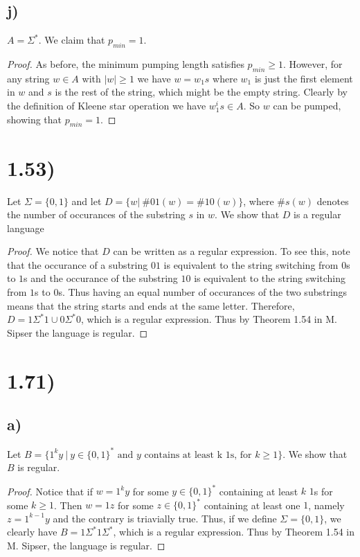 \documentclass[a4paper,11pt]{article}
\newcommand{\abs}[1]{\left\lvert #1 \right\rvert}
\numberwithin{equation}{section}
\begin{document}
\subsection*{j)}
$A=\Sigma^\ast$. We claim that $p_{min}=1$.
\begin{proof}
As before, the minimum pumping length satisfies $p_{min}\geq1$. However, for any string $w\in A$ with $\abs{w}\geq1$ we have $w=w_1s$ where $w_1$ is just the first element in $w$ and $s$ is the rest of the string, which might be the empty string. Clearly by the definition of Kleene star operation we have $w_1^is\in A$. So $w$ can be pumped, showing that $p_{min}=1$.
\end{proof}
\section*{1.53)}
Let $\Sigma=\{0,1\}$ and let $D=\{w \vert\ \#01(w)=\#10(w)\}$, where $\#s(w)$ denotes the number of occurances of the substring $s$ in $w$. We show that $D$ is a regular language\begin{proof}
We notice that $D$ can be written as a regular expression. To see this, note that the occurance of a substring $01$ is equivalent to the string switching from $0$s to $1$s and the occurance of the substring $10$ is equivalent to the string switching from $1$s to $0$s. Thus having an equal number of occurances of the two substrings means that the string starts and ends at the same letter. Therefore, $D=1\Sigma^\ast1\cup0\Sigma^\ast0$, which is a regular expression. Thus by Theorem 1.54 in M. Sipser the language is regular. 
\end{proof}
\section*{1.71)}
\subsection*{a)}
Let $B=\{1^ky\ \vert\ y\in\{0,1\}^\ast\text{ and $y$ contains at least k $1$s, for }k\geq1\}$. We show that $B$ is regular. \begin{proof}
Notice that if $w=1^ky$ for some $y\in \{0,1\}^\ast$ containing at least $k$ $1$s for some $k\geq1$. Then $w=1z$ for some $z\in \{0,1\}^\ast$ containing at least one $1$, namely $z=1^{k-1}y$ and the contrary is triavially true. Thus, if we define $\Sigma=\{0,1\}$, we clearly have $B=1\Sigma^\ast1\Sigma^\ast$, which is a regular expression. Thus by Theorem 1.54 in M. Sipser, the language is regular.
\end{proof}
\end{document}
